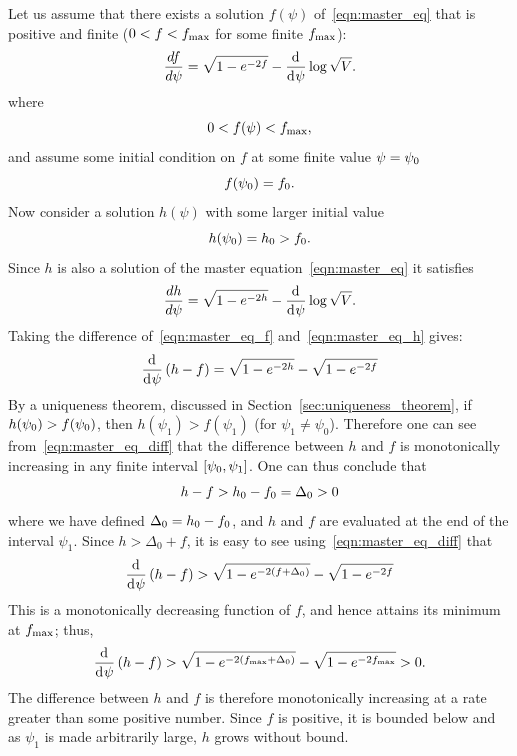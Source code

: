Let us assume that there exists a solution $f(\psi)$ of~\eqref{eqn:master_eq} that is positive and finite ($0<f<f_\mathrm{max}$ for some finite $f_\mathrm{max}$):
%
\begin{equation}
  \frac{d f}{d \psi} = \sqrt{1-e^{-2f}} -\frac{\operatorname{d}^{}\!{}}{\operatorname{d}^{}\!{\psi}}\log \sqrt V.
  \label{eqn:master_eq_f}
\end{equation}
%
where
%
\begin{equation}
  0<f(\psi)<f_\mathrm{max},
\end{equation}
%
and assume some initial condition on $f$ at some finite value
$\psi=\psi_0$
%
\begin{equation}
  f(\psi_0)=f_0.
\end{equation}
%
Now consider a solution $h(\psi)$ with some larger initial value
%
\begin{equation}
  h(\psi_0)=h_0>f_0.
\end{equation}
%
Since $h$ is also a solution of the master equation~\eqref{eqn:master_eq} it satisfies
%
\begin{equation}
  \frac{d h}{d \psi} = \sqrt{1-e^{-2h}} -\frac{\operatorname{d}^{}\!{}}{\operatorname{d}^{}\!{\psi}}\log \sqrt V.
  \label{eqn:master_eq_h}
\end{equation}
%
Taking the difference of~\eqref{eqn:master_eq_f} and~\eqref{eqn:master_eq_h} gives:
%
\begin{equation}
  \frac{\operatorname{d}^{}\!{}}{\operatorname{d}^{}\!{\psi}}\left(h-f\right)
  = 
  \sqrt{1-e^{-2h}}-\sqrt{1-e^{-2f}}
  \label{eqn:master_eq_diff}
\end{equation}
%
By a uniqueness theorem, discussed in Section~\ref{sec:uniqueness_theorem}, if $h(\psi_0)>f(\psi_0)$, then $h(\psi_1)>f(\psi_1)$ (for $\psi_1\ne\psi_0$). Therefore one can see from~\eqref{eqn:master_eq_diff} that the difference between $h$ and $f$ is monotonically increasing in any finite interval $[\psi_0,\psi_1]$.  One can thus conclude that
%
\begin{equation}
  h-f>h_0-f_0=\Delta_0>0
  \label{eqn:cosh_rel}
\end{equation}
%
where we have defined $\Delta_0 = h_0-f_0$, and $h$ and $f$ are evaluated at the end of the interval $\psi_1$. Since $h>\Delta_0+f$, it is easy to see using~\eqref{eqn:master_eq_diff} that
%
\begin{equation}
  \frac{\operatorname{d}^{}\!{}}{\operatorname{d}^{}\!{\psi}}\left(h-f\right)
  > 
  \sqrt{1-e^{-2(f+\Delta_0)}}-\sqrt{1-e^{-2f}}
\end{equation}
%
This is a monotonically decreasing function of $f$, and hence attains its minimum at $f_\mathrm{max}$; thus,
%
\begin{equation}
  \frac{\operatorname{d}^{}\!{}}{\operatorname{d}^{}\!{\psi}}\left(h-f\right)
  > 
  \sqrt{1-e^{-2(f_\mathrm{max}+\Delta_0)}}-\sqrt{1-e^{-2f_\mathrm{max}}} 
  >
  0.
\end{equation}
%
The difference between $h$ and $f$ is therefore monotonically increasing at a rate greater than some positive number. Since $f$ is positive, it is bounded below and as $\psi_1$ is made arbitrarily large, $h$ grows without bound.

